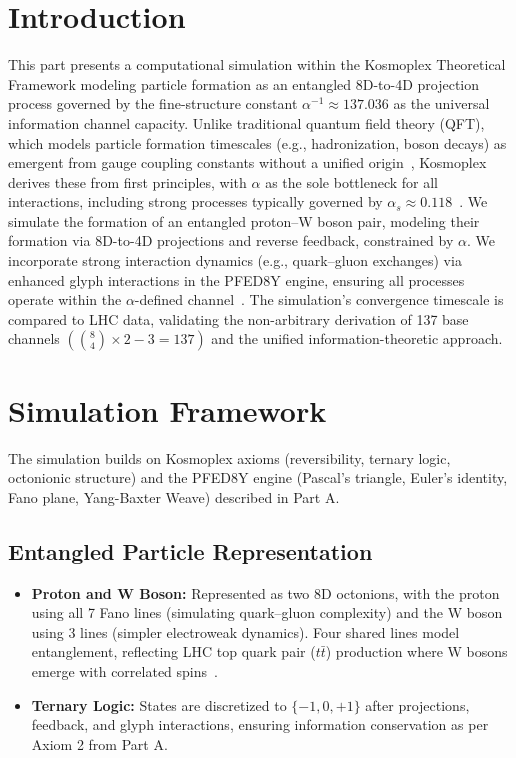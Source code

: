 \documentclass[pdflatex,sn-mathphys-num]{sn-jnl}
\theoremstyle{thmstyleone}
\theoremstyle{thmstyletwo}
\theoremstyle{thmstylethree}
\begin{document}
\section{Introduction}\label{sec:s2-intro}
This part presents a computational simulation within the Kosmoplex Theoretical Framework modeling particle formation as an entangled 8D-to-4D projection process governed by the fine-structure constant $\alpha^{-1} \approx 137.036$ as the universal information channel capacity. Unlike traditional quantum field theory (QFT), which models particle formation timescales (e.g., hadronization, boson decays) as emergent from gauge coupling constants without a unified origin~\cite{atlas2015top,alice2017femto}, Kosmoplex derives these from first principles, with $\alpha$ as the sole bottleneck for all interactions, including strong processes typically governed by $\alpha_s \approx 0.118$~\cite{pdg2024}.
We simulate the formation of an entangled proton--W boson pair, modeling their formation via 8D-to-4D projections and reverse feedback, constrained by $\alpha$. We incorporate strong interaction dynamics (e.g., quark--gluon exchanges) via enhanced glyph interactions in the PFED8Y engine, ensuring all processes operate within the $\alpha$-defined channel~\cite{macedonia2025principia}. The simulation's convergence timescale is compared to LHC data, validating the non-arbitrary derivation of 137 base channels $\left(\binom{8}{4} \times 2 - 3 = 137\right)$ and the unified information-theoretic approach.

\section{Simulation Framework}\label{sec:s2-framework}
The simulation builds on Kosmoplex axioms (reversibility, ternary logic, octonionic structure) and the PFED8Y engine (Pascal's triangle, Euler's identity, Fano plane, Yang-Baxter Weave) described in Part A.

\subsection{Entangled Particle Representation}\label{subsec:s2-entangled}

\begin{itemize}
    \item \textbf{Proton and W Boson:} Represented as two 8D octonions, with the proton using all 7 Fano lines (simulating quark--gluon complexity) and the W boson using 3 lines (simpler electroweak dynamics). Four shared lines model entanglement, reflecting LHC top quark pair ($t\bar{t}$) production where W bosons emerge with correlated spins~\cite{atlas2022entanglement}.
   
    \item \textbf{Ternary Logic:} States are discretized to $\{-1, 0, +1\}$ after projections, feedback, and glyph interactions, ensuring information conservation as per Axiom 2 from Part A.
\end{itemize}
\end{document}

